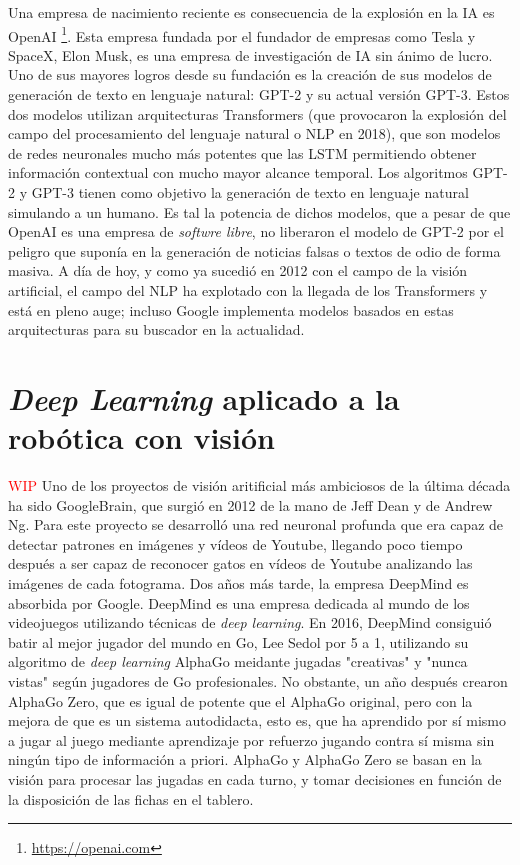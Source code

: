 Una empresa de nacimiento reciente es consecuencia de la explosión en la IA es OpenAI \footnote{\url{https://openai.com}}. Esta empresa fundada por el fundador de empresas como Tesla y SpaceX, Elon Musk, es una empresa de investigación de IA sin ánimo de lucro. Uno de sus mayores logros desde su fundación es la creación de sus modelos de generación de texto en lenguaje natural: GPT-2 y su actual versión GPT-3. Estos dos modelos utilizan arquitecturas Transformers (que provocaron la explosión del campo del procesamiento del lenguaje natural o NLP en 2018), que son modelos de redes neuronales mucho más potentes que las LSTM permitiendo obtener información contextual con mucho mayor alcance temporal. Los algoritmos GPT-2 y GPT-3 tienen como objetivo la generación de texto en lenguaje natural simulando a un humano. Es tal la potencia de dichos modelos, que a pesar de que OpenAI es una empresa de \textit{softwre libre}, no liberaron el modelo de GPT-2 por el peligro que suponía en la generación de noticias falsas o textos de odio de forma masiva. A día de hoy, y como ya sucedió en 2012 con el campo de la visión artificial, el campo del NLP ha explotado con la llegada de los Transformers y está en pleno auge; incluso Google implementa modelos basados en estas arquitecturas para su buscador en la actualidad.

\section{\textit{Deep Learning} aplicado a la robótica con visión}

\textcolor{red}{WIP}
Uno de los proyectos de visión aritificial más ambiciosos de la última década ha sido GoogleBrain, que surgió en 2012 de la mano de Jeff Dean y de Andrew Ng. Para este proyecto se desarrolló una red neuronal profunda que era capaz de detectar patrones en imágenes y vídeos de Youtube, llegando poco tiempo después a ser capaz de reconocer gatos en vídeos de Youtube analizando las imágenes de cada fotograma. Dos años más tarde, la empresa DeepMind es absorbida por Google. DeepMind es una empresa dedicada al mundo de los videojuegos utilizando técnicas de \textit{deep learning}. En 2016, DeepMind consiguió batir al mejor jugador del mundo en Go, Lee Sedol por 5 a 1, utilizando su algoritmo de \textit{deep learning} AlphaGo meidante jugadas "creativas" y "nunca vistas" según jugadores de Go profesionales. No obstante, un año después crearon AlphaGo Zero, que es igual de potente que el AlphaGo original, pero con la mejora de que es un sistema autodidacta, esto es, que ha aprendido por sí mismo a jugar al juego mediante aprendizaje por refuerzo jugando contra sí misma sin ningún tipo de información a priori. AlphaGo y AlphaGo Zero se basan en la visión para procesar las jugadas en cada turno, y tomar decisiones en función de la disposición de las fichas en el tablero.


